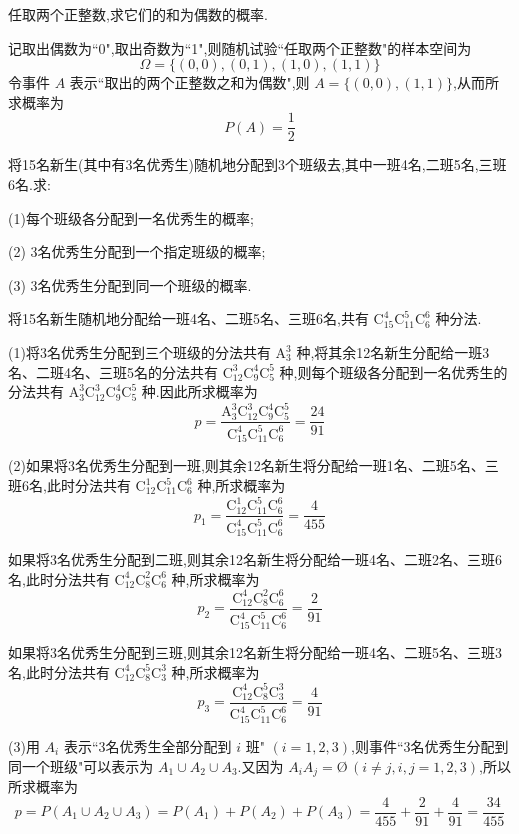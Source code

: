 \question 任取两个正整数,求它们的和为偶数的概率.

\begin{solution}
    记取出偶数为``0",取出奇数为``1",则随机试验``任取两个正整数"的样本空间为
    $$
    \varOmega = \{ (0,0), (0,1), (1,0), (1,1) \}
    $$
    令事件 $A$ 表示``取出的两个正整数之和为偶数",则 $A = \{ (0,0), (1,1) \}$,从而所求概率为 $$P(A) = \dfrac{1}{2}$$
\end{solution}

\question 将15名新生(其中有3名优秀生)随机地分配到3个班级去,其中一班4名,二班5名,三班6名.求:

(1)每个班级各分配到一名优秀生的概率;

(2) 3名优秀生分配到一个指定班级的概率;

(3) 3名优秀生分配到同一个班级的概率.

\begin{solution}
    将15名新生随机地分配给一班4名、二班5名、三班6名,共有 $\mathrm{C}_{15}^4 \mathrm{C}_{11}^5 \mathrm{C}_6^6$ 种分法.

    (1)将3名优秀生分配到三个班级的分法共有 $\mathrm{A}_3^3$ 种,将其余12名新生分配给一班3名、二班4名、三班5名的分法共有 $\mathrm{C}_{12}^3 \mathrm{C}_9^4 \mathrm{C}_5^5$ 种,则每个班级各分配到一名优秀生的分法共有 $\mathrm{A}_3^3 \mathrm{C}_{12}^3 \mathrm{C}_9^4 \mathrm{C}_5^5$ 种.因此所求概率为
    $$
    p = \dfrac{\mathrm{A}_3^3 \mathrm{C}_{12}^3 \mathrm{C}_9^4 \mathrm{C}_5^5}{\mathrm{C}_{15}^4 \mathrm{C}_{11}^5 \mathrm{C}_6^6} = \dfrac{24}{91}
    $$

    (2)如果将3名优秀生分配到一班,则其余12名新生将分配给一班1名、二班5名、三班6名,此时分法共有 $\mathrm{C}_{12}^1 \mathrm{C}_{11}^5 \mathrm{C}_6^6$ 种,所求概率为
    $$
    p_1 = \dfrac{\mathrm{C}_{12}^1 \mathrm{C}_{11}^5 \mathrm{C}_6^6}{\mathrm{C}_{15}^4 \mathrm{C}_{11}^5 \mathrm{C}_6^6} = \dfrac{4}{455}
    $$

    如果将3名优秀生分配到二班,则其余12名新生将分配给一班4名、二班2名、三班6名,此时分法共有 $\mathrm{C}_{12}^4 \mathrm{C}_{8}^2 \mathrm{C}_6^6$ 种,所求概率为
    $$
    p_2 = \dfrac{\mathrm{C}_{12}^4 \mathrm{C}_{8}^2 \mathrm{C}_6^6}{\mathrm{C}_{15}^4 \mathrm{C}_{11}^5 \mathrm{C}_6^6} = \dfrac{2}{91}
    $$

    如果将3名优秀生分配到三班,则其余12名新生将分配给一班4名、二班5名、三班3名,此时分法共有 $\mathrm{C}_{12}^4 \mathrm{C}_{8}^5 \mathrm{C}_3^3$ 种,所求概率为
    $$
    p_3 = \dfrac{\mathrm{C}_{12}^4 \mathrm{C}_{8}^5 \mathrm{C}_3^3}{\mathrm{C}_{15}^4 \mathrm{C}_{11}^5 \mathrm{C}_6^6} = \dfrac{4}{91}
    $$

    (3)用 $A_i$ 表示``3名优秀生全部分配到 $i$ 班" $(i=1,2,3)$,则事件``3名优秀生分配到同一个班级"可以表示为 $A_1 \cup A_2 \cup A_3$.又因为 $A_i A_j = \text{\O} \, (i \not= j, i,j=1,2,3)$,所以所求概率为
    $$
    p = P(A_1 \cup A_2 \cup A_3) = P(A_1) + P(A_2) + P(A_3) = \dfrac{4}{455} + \dfrac{2}{91} + \dfrac{4}{91} = \dfrac{34}{455}
    $$
\end{solution}

